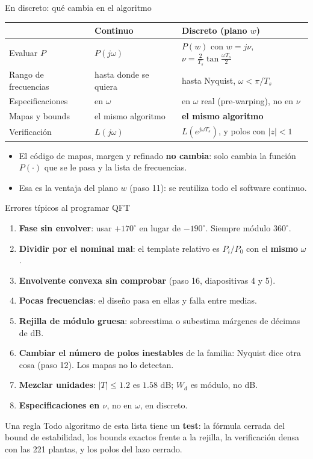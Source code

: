 \documentclass[aspectratio=169,11pt]{beamer}
\begin{document}
\begin{frame}{En discreto: qué cambia en el algoritmo}
  \small
  \begin{center}
  \begin{tabular}{l|l|l}
    & Continuo & Discreto (plano $w$)\\\hline
    Evaluar $P$ & $P(j\omega)$ & $P(w)$ con $w=j\nu$, $\nu=\frac{2}{T_s}\tan\frac{\omega T_s}{2}$\\[2pt]
    Rango de frecuencias & hasta donde se quiera & hasta Nyquist, $\omega<\pi/T_s$\\[2pt]
    Especificaciones & en $\omega$ & en $\omega$ real (pre-warping), no en $\nu$\\[2pt]
    Mapas y bounds & el mismo algoritmo & \textbf{el mismo algoritmo}\\[2pt]
    Verificación & $L(j\omega)$ & $L(e^{j\omega T_s})$, y polos con $|z|<1$
  \end{tabular}
  \end{center}
  \begin{itemize}
    \item El código de mapas, margen y refinado \textbf{no cambia}: solo cambia la función $P(\cdot)$ que se le pasa y la lista de frecuencias.
    \item Esa es la ventaja del plano $w$ (paso 11): se reutiliza todo el software continuo.
  \end{itemize}
\end{frame}

\begin{frame}{Errores típicos al programar QFT}
  \footnotesize
  \begin{enumerate}
    \item \textbf{Fase sin envolver}: usar $+170^\circ$ en lugar de $-190^\circ$. Siempre módulo $360^\circ$.
    \item \textbf{Dividir por el nominal mal}: el template relativo es $P_i/P_0$ con el \textbf{mismo} $\omega$.
    \item \textbf{Envolvente convexa sin comprobar} (paso 16, diapositivas 4 y 5).
    \item \textbf{Pocas frecuencias}: el diseño pasa en ellas y falla entre medias.
    \item \textbf{Rejilla de módulo gruesa}: sobreestima o subestima márgenes de décimas de dB.
    \item \textbf{Cambiar el número de polos inestables} de la familia: Nyquist dice otra cosa (paso 12). Los mapas no lo detectan.
    \item \textbf{Mezclar unidades}: $|T|\le1.2$ es $1.58$ dB; $W_d$ es módulo, no dB.
    \item \textbf{Especificaciones en $\nu$}, no en $\omega$, en discreto.
  \end{enumerate}
  \begin{alertblock}{Una regla}
    Todo algoritmo de esta lista tiene un \textbf{test}: la fórmula cerrada del bound de estabilidad, los bounds exactos frente a la rejilla, la verificación densa con las 221 plantas, y los polos del lazo cerrado.
  \end{alertblock}
\end{frame}
\end{document}
